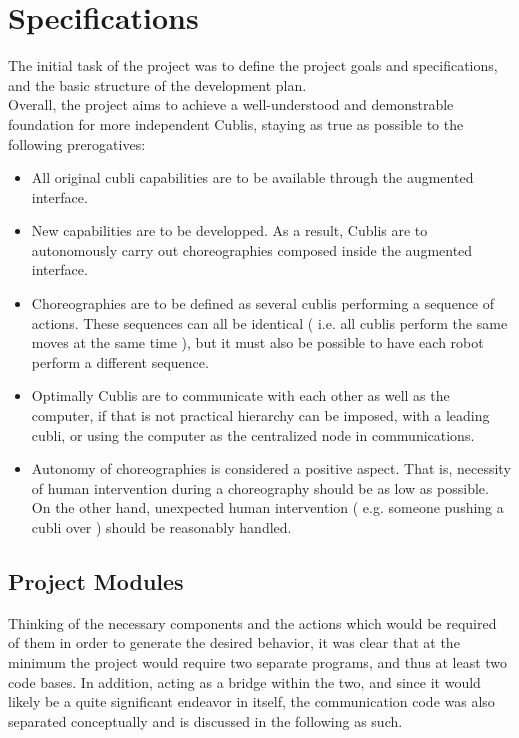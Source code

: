 \chapter{Specifications}\label{sec:specifications}

The initial task of the project was to define the project goals and specifications, and the basic structure of the development plan.\\ 

Overall, the project aims to achieve a well-understood and demonstrable foundation for more independent Cublis, staying as true as possible to the following prerogatives:

\begin{itemize}

\item[] All original cubli capabilities are to be available through the augmented interface.

\item[] New capabilities are to be developped. As a result, Cublis are to autonomously carry out choreographies composed inside the augmented interface.

\item[] Choreographies are to be defined as several cublis performing a sequence of actions. These sequences can all be identical ( i.e. all cublis perform the same moves at the same time ), but it must also be possible to have each robot perform a different sequence.

\item[] Optimally Cublis are to communicate with each other as well as the computer, if that is not practical hierarchy can be imposed, with a leading cubli, or using the computer as the centralized node in communications.

\item[] Autonomy of choreographies is considered a positive aspect. That is, necessity of human intervention during a choreography should be as low as possible. On the other hand,  unexpected human intervention ( e.g. someone pushing a cubli over ) should be reasonably handled.

\end{itemize}




\section{Project Modules}

Thinking of the necessary components and the actions which would be required of them in order to generate the desired behavior, it was clear that at the minimum the project would require two separate programs, and thus at least two code bases. In addition, acting as a bridge within the two, and since it would likely be a quite significant endeavor in itself, the communication code was also separated conceptually and is discussed in the following as such.\\ 


